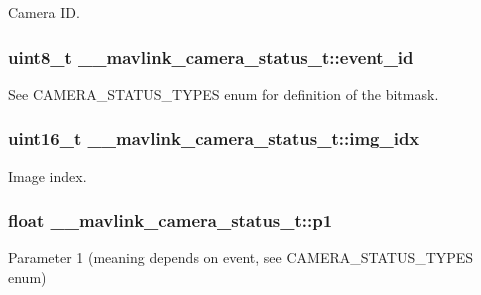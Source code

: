 Camera I\+D. 

\hypertarget{struct____mavlink__camera__status__t_a21082504252f369243898d1f39579f84}{
\subsubsection[{event\+\_\+id}]{\setlength{\rightskip}{0pt plus 5cm}uint8\+\_\+t \+\_\+\+\_\+mavlink\+\_\+camera\+\_\+status\+\_\+t\+::event\+\_\+id}}\label{struct____mavlink__camera__status__t_a21082504252f369243898d1f39579f84}


See C\+A\+M\+E\+R\+A\+\_\+\+S\+T\+A\+T\+U\+S\+\_\+\+T\+Y\+P\+E\+S enum for definition of the bitmask. 

\hypertarget{struct____mavlink__camera__status__t_a7833bdc7c05f95ad25ad03c5a4721bb7}{
\subsubsection[{img\+\_\+idx}]{\setlength{\rightskip}{0pt plus 5cm}uint16\+\_\+t \+\_\+\+\_\+mavlink\+\_\+camera\+\_\+status\+\_\+t\+::img\+\_\+idx}}\label{struct____mavlink__camera__status__t_a7833bdc7c05f95ad25ad03c5a4721bb7}


Image index. 

\hypertarget{struct____mavlink__camera__status__t_a9f0f4d16590fffe5524c6051e5b2405d}{
\subsubsection[{p1}]{\setlength{\rightskip}{0pt plus 5cm}float \+\_\+\+\_\+mavlink\+\_\+camera\+\_\+status\+\_\+t\+::p1}}\label{struct____mavlink__camera__status__t_a9f0f4d16590fffe5524c6051e5b2405d}


Parameter 1 (meaning depends on event, see C\+A\+M\+E\+R\+A\+\_\+\+S\+T\+A\+T\+U\+S\+\_\+\+T\+Y\+P\+E\+S enum) 

